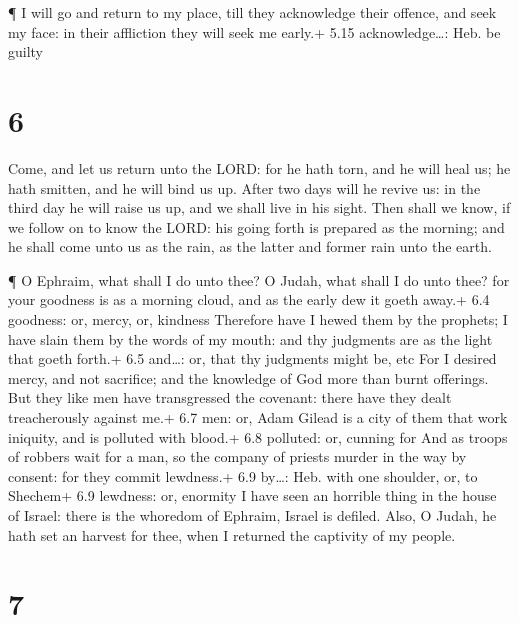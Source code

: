  ¶ I will go and return to my place, till they acknowledge
their offence, and seek my face: in their affliction they will seek me
early.+ 5.15 acknowledge\ldots: Heb. be guilty

\hypertarget{section-5}{%
\section{6}\label{section-5}}

 Come, and let us return unto the LORD: for he hath torn,
and he will heal us; he hath smitten, and he will bind us up.
 After two days will he revive us: in the third day he will
raise us up, and we shall live in his sight.  Then shall we
know, if we follow on to know the LORD: his going forth is prepared as
the morning; and he shall come unto us as the rain, as the latter and
former rain unto the earth.

 ¶ O Ephraim, what shall I do unto thee? O Judah, what shall
I do unto thee? for your goodness is as a morning cloud, and as the
early dew it goeth away.+ 6.4 goodness: or, mercy, or, kindness
 Therefore have I hewed them by the prophets; I have slain
them by the words of my mouth: and thy judgments are as the light that
goeth forth.+ 6.5 and\ldots: or, that thy judgments might be, etc
 For I desired mercy, and not sacrifice; and the knowledge
of God more than burnt offerings.  But they like men have
transgressed the covenant: there have they dealt treacherously against
me.+ 6.7 men: or, Adam  Gilead is a city of them that work
iniquity, and is polluted with blood.+ 6.8 polluted: or, cunning for
 And as troops of robbers wait for a man, so the company of
priests murder in the way by consent: for they commit lewdness.+ 6.9
by\ldots: Heb. with one shoulder, or, to Shechem+ 6.9 lewdness: or,
enormity  I have seen an horrible thing in the house of
Israel: there is the whoredom of Ephraim, Israel is defiled.
 Also, O Judah, he hath set an harvest for thee, when I
returned the captivity of my people.

\hypertarget{section-6}{%
\section{7}\label{section-6}}

